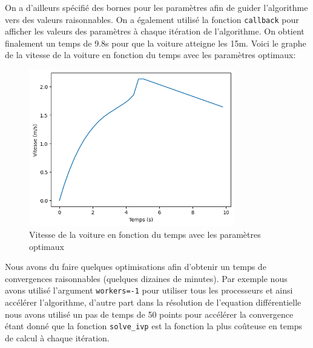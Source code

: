 \documentclass{report}
\begin{document}
On a d'ailleurs spécifié des bornes pour les paramètres afin de guider l'algorithme vers des valeurs raisonnables. On a également utilisé la fonction \texttt{callback} pour afficher les valeurs des paramètres à chaque itération de l'algorithme. On obtient finalement un temps de 9.8s pour que la voiture atteigne les 15m. Voici le graphe de la vitesse de la voiture en fonction du temps avec les paramètres optimaux: \\
\begin{figure}[h]
    \centering
    \includegraphics[width=0.8\textwidth]{vitesse_temps_optimal}
    \caption{Vitesse de la voiture en fonction du temps avec les paramètres optimaux}
\end{figure}
Nous avons du faire quelques optimisations afin d'obtenir un temps de convergences raisonnables (quelques dizaines de minutes). Par exemple nous avons utilisé l'argument \texttt{workers=-1} pour utiliser tous les processeurs et ainsi accélérer l'algorithme, d'autre part dans la résolution de l'equation différentielle nous avons utilisé un pas de temps de 50 points pour accélérer la convergence étant donné que la fonction \texttt{solve\_ivp} est la fonction la plus coûteuse en temps de calcul à chaque itération.
\end{document}

